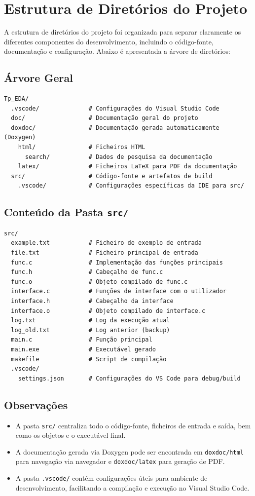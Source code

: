 \documentclass[a4paper,12pt]{article}
\begin{document}
\section{Estrutura de Diretórios do Projeto}

A estrutura de diretórios do projeto foi organizada para separar claramente os diferentes componentes do desenvolvimento, incluindo o código-fonte, documentação e configuração. Abaixo é apresentada a árvore de diretórios:

\subsection*{Árvore Geral}
\begin{verbatim}
Tp_EDA/
  .vscode/              # Configurações do Visual Studio Code
  doc/                  # Documentação geral do projeto
  doxdoc/               # Documentação gerada automaticamente (Doxygen)
    html/               # Ficheiros HTML
      search/           # Dados de pesquisa da documentação
    latex/              # Ficheiros LaTeX para PDF da documentação
  src/                  # Código-fonte e artefatos de build
    .vscode/            # Configurações específicas da IDE para src/
\end{verbatim}

\subsection*{Conteúdo da Pasta \texttt{src/}}
\begin{verbatim}
src/
  example.txt           # Ficheiro de exemplo de entrada
  file.txt              # Ficheiro principal de entrada
  func.c                # Implementação das funções principais
  func.h                # Cabeçalho de func.c
  func.o                # Objeto compilado de func.c
  interface.c           # Funções de interface com o utilizador
  interface.h           # Cabeçalho da interface
  interface.o           # Objeto compilado de interface.c
  log.txt               # Log da execução atual
  log_old.txt           # Log anterior (backup)
  main.c                # Função principal
  main.exe              # Executável gerado
  makefile              # Script de compilação
  .vscode/
    settings.json       # Configurações do VS Code para debug/build
\end{verbatim}

\subsection*{Observações}
\begin{itemize}
    \item A pasta \texttt{src/} centraliza todo o código-fonte, ficheiros de entrada e saída, bem como os objetos e o executável final.
    \item A documentação gerada via Doxygen pode ser encontrada em \texttt{doxdoc/html} para navegação via navegador e \texttt{doxdoc/latex} para geração de PDF.
    \item A pasta \texttt{.vscode/} contém configurações úteis para ambiente de desenvolvimento, facilitando a compilação e execução no Visual Studio Code.
\end{itemize}
\end{document}
